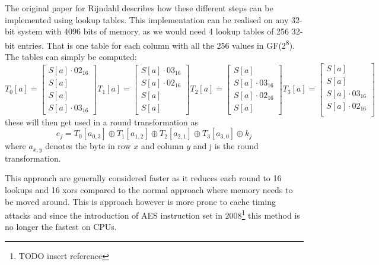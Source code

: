 \documentclass[a4paper]{article}
\begin{document}
\begin{enumerate}
The original paper for Rijndahl\cite{Rijndahl} describes how these different steps can be implemented using lookup tables. This implementation can be realised on any 32-bit system with 4096 bits of memory, as we would need 4 lookup tables of 256 32-bit entries. That is one table for each column with all the 256 values in GF(2\textsuperscript{8}). The tables can simply be computed:
\begin{equation}
T_0[a] = \begin{bmatrix}
          S[a] \cdot 02_{16}\\
          S[a]\\
          S[a]\\
          S[a] \cdot 03_{16}
\end{bmatrix}
T_1[a] = \begin{bmatrix}
          S[a] \cdot 03_{16}\\
          S[a] \cdot 02_{16}\\
          S[a]\\
          S[a]
\end{bmatrix}
T_2[a] = \begin{bmatrix}
          S[a]\\
          S[a] \cdot 03_{16}\\
          S[a] \cdot 02_{16}\\
          S[a]
\end{bmatrix}
T_3[a] = \begin{bmatrix}
          S[a]\\
          S[a]\\
          S[a] \cdot 03_{16}\\
          S[a] \cdot 02_{16}\\
\end{bmatrix}
\end{equation}
these will then get used in a round transformation as
\begin{equation}
e_j = T_0 [a_{0,3}] \oplus T_1 [a_{1,2}] \oplus T_2 [a_{2,1}] \oplus T_3 [a_{3,0}] \oplus k_j
\end{equation}
where \(a_{x,y}\) denotes the byte in row \(x\) and column \(y\) and j is the round transformation.

This approach are generally considered faster as it reduces each round to 16 lookups and 16 xors compared to the normal approach where memory needs to be moved around. This is approach however is more prone to cache timing attacks and since the introduction of AES instruction set in 2008\cite{intel}\footnote{TODO insert reference} this method is no longer the fastest on CPUs.

\end{enumerate}
\end{document}
